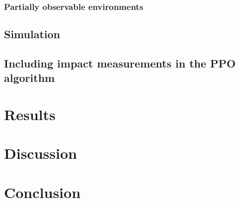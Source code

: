 \documentclass[12pt,A4]{report}
\theoremstyle{definition}
\begin{document}
\subsection{Partially observable environments}

\section{Simulation}

\section{Including impact measurements in the PPO algorithm}





\chapter{Results}




\chapter{Discussion}






\chapter{Conclusion}


\printbibliography
\end{document}

